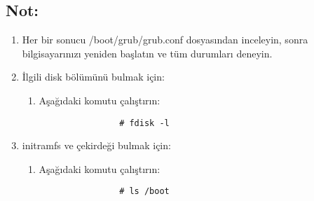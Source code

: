 \documentclass[a4paper,10pt]{article}
\begin{document}
\subsection*{Not:}
    \begin{enumerate}
    \item Her bir sonucu /boot/grub/grub.conf dosyasından inceleyin, sonra bilgisayarınızı yeniden başlatın ve tüm durumları deneyin.
    \item İlgili disk bölümünü bulmak için:
        \begin{enumerate}
            \item Aşağıdaki komutu çalıştırın:
            \begin{verbatim}
                # fdisk -l
            \end{verbatim}
        \end{enumerate}
    \item initramfs ve çekirdeği bulmak için:
        \begin{enumerate}
            \item Aşağıdaki komutu çalıştırın:
            \begin{verbatim}
                # ls /boot
            \end{verbatim}
        \end{enumerate}
    \end{enumerate}
\end{document}
